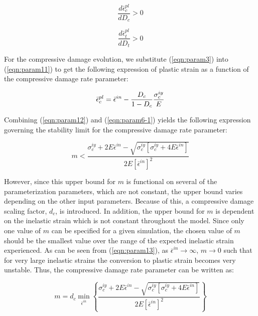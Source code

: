 \begin{equation}
\label{eqn:param6-1}
\frac{d\bar{\epsilon}_{c}^{pl}}{dD_{c}}>0
\end{equation}

\begin{equation}
\label{eqn:param6-2}
\frac{d\bar{\epsilon}_{t}^{pl}}{dD_{t}}>0
\end{equation}

For the compressive damage evolution, we substitute (\ref{eqn:param3}) into (\ref{eqn:param11}) to get the following expression of plastic strain as a function of the compressive damage rate parameter:

\begin{equation}
\bar{\epsilon}_{c}^{pl}=\bar{\epsilon}^{in}-\frac{D_{c}}{1-D_{c}}\frac{\sigma_{c}^{iy}}{E}\\
\label{eqn:param12}
\end{equation}

Combining (\ref{eqn:param12}) and (\ref{eqn:param6-1}) yields the following expression governing the stability limit for the compressive damage rate parameter:

\begin{equation}
m<\frac{\sigma_{c}^{iy}+2E\bar{\epsilon}^{in}-\sqrt{\sigma_{c}^{iy}\left[\sigma_{c}^{iy}+4E\bar{\epsilon}^{in}\right]}}{2E\left[\bar{\epsilon}^{in}\right]^{2}}\label{eqn:param13}
\end{equation}

However, since this upper bound for $m$ is functional on several of the parameterization parameters, which are not constant, the upper bound varies depending on the other input parameters. Because of this, a compressive damage scaling factor, $d_c$, is introduced. In addition, the upper bound for $m$ is dependent on the inelastic strain which is not constant throughout the model. Since only one value of $m$ can be specified for a given simulation, the chosen value of $m$ should be the smallest value over the range of the expected inelastic strain experienced. As can be seen from (\ref{eqn:param13}), as $\bar{\epsilon}^{in} \rightarrow \infty$, $m\rightarrow0$ such that for very large inelastic strains the conversion to plastic strain becomes very unstable. Thus, the compressive damage rate parameter can be written as:

\begin{equation}
m=d_{c}\min_{\bar{\epsilon}^{in}}\left\{\frac{\sigma_{c}^{iy}+2E\bar{\epsilon}^{in}-\sqrt{\sigma_{c}^{iy}\left[\sigma_{c}^{iy}+4E\bar{\epsilon}^{in}\right]}}{2E\left[\bar{\epsilon}^{in}\right]^{2}}\right\}
\label{eqn:param14}
\end{equation}

